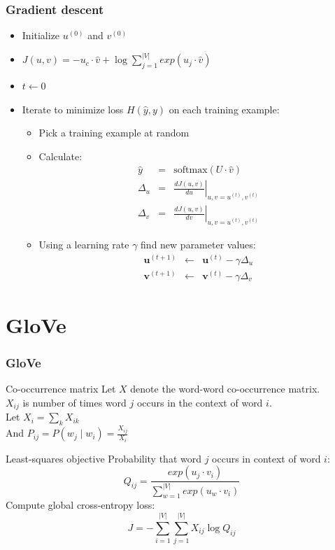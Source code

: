 \begin{frame}
\frametitle{Gradient descent}
\begin{itemize}[<+->]
\item Initialize $u^{(0)}$ and $v^{(0)}$ 
\item $J(u,v) = - u_c \cdot \hat{v} + \log \sum_{j=1}^{|V|} exp(u_j \cdot \hat{v})$
\item $t \leftarrow 0$
\item Iterate to minimize loss $H(\hat{y}, y)$ on each training example:
\begin{itemize}[<+->]
\item Pick a training example at random
\item Calculate: 
\begin{eqnarray*}
	\hat{y} &=& \textrm{softmax}(U \cdot \hat{v}) \\
	\Delta_u &=& \left. \frac{d J(u,v)}{d u}  \right|_{u,v = u^{(t)}, v^{(t)}} \\
	\Delta_v &=& \left. \frac{d J(u,v)}{d v}  \right|_{u,v = u^{(t)}, v^{(t)}}
\end{eqnarray*}
\item Using a learning rate $\gamma$ find new parameter values:
\begin{eqnarray*}
	\textbf{u}^{(t+1)} &\leftarrow& \textbf{u}^{(t)} - \gamma \Delta_u \\
	\textbf{v}^{(t+1)} &\leftarrow& \textbf{v}^{(t)} - \gamma \Delta_v
\end{eqnarray*}
\end{itemize}
\end{itemize}
\end{frame}

\section{GloVe}
\frame{\tableofcontents[currentsection]}

\begin{frame}
\frametitle{GloVe}
\begin{alertblock}{Co-occurrence matrix}
Let $X$ denote the word-word co-occurrence matrix.\\
$X_{ij}$ is number of times word $j$ occurs in the context of word $i$.\\
Let $X_i = \sum_k X_{ik}$ \\
And $P_{ij} = P(w_j \mid w_i) = \frac{X_{ij}}{X_i}$	
\end{alertblock}
\pause
\begin{alertblock}{Least-squares objective}
Probability that word $j$ occurs in context of word $i$:
\[ Q_{ij} = \frac{exp(u_j \cdot v_i)}{\sum_{w=1}^{|V|} exp(u_w \cdot v_i) } \]
Compute global cross-entropy loss:
\[ J = - \sum_{i=1}^{|V|} \sum_{j=1}^{|V|} X_{ij} \log Q_{ij} \]
\end{alertblock}
\end{frame}

